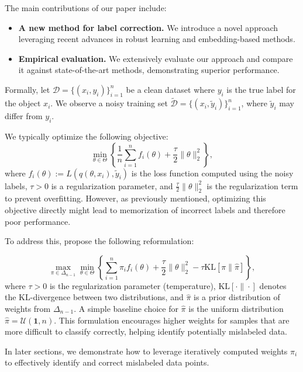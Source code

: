 \documentclass[12pt]{article}
\begin{document}
The main contributions of our paper include:
\begin{itemize}
    \item \textbf{A new method for label correction.} We introduce a novel approach leveraging recent advances in robust learning and embedding-based methods.
    \item \textbf{Empirical evaluation.} We extensively evaluate our approach and compare it against state-of-the-art methods, demonstrating superior performance.
\end{itemize}

Formally, let \(\mathcal{D} = \{(x_i, y_i)\}_{i=1}^{n}\) be a clean dataset where \(y_i\) is the true label for the object \(x_i\). We observe a noisy training set \(\tilde{\mathcal{D}} = \{(x_i, \tilde{y}_i)\}_{i=1}^{n}\), where \(\tilde{y}_i\) may differ from \(y_i\).

We typically optimize the following objective:
\begin{equation}
    \min_{\theta \in \Theta} \left\{
        \frac{1}{n}\sum_{i=1}^{n} f_i(\theta) + \frac{\tau}{2}\|\theta\|_2^2
    \right\},
\end{equation}
where \(f_i(\theta) := L(q(\theta, x_i), \tilde{y}_i)\) is the loss function computed using the noisy labels, \(\tau > 0\) is a regularization parameter, and \(\frac{\tau}{2}\|\theta\|_2^2\) is the regularization term to prevent overfitting. However, as previously mentioned, optimizing this objective directly might lead to memorization of incorrect labels and therefore poor performance.

To address this, \citet{also} propose the following reformulation:

\begin{equation}
    \max_{\pi \in \Delta_{n-1}} \min_{\theta \in \Theta}
    \left\{
        \sum_{i=1}^{n}\pi_i f_i(\theta)
        + \frac{\tau}{2}\|\theta\|_2^2
        - \tau\text{KL}[\pi\|\hat{\pi}]
    \right\},
\end{equation}
where \(\tau > 0\) is the regularization parameter (temperature), \(\text{KL}[\cdot\|\cdot]\) denotes the KL-divergence between two distributions, and \(\hat{\pi}\) is a prior distribution of weights from \(\Delta_{n-1}\). A simple baseline choice for \(\hat{\pi}\) is the uniform distribution \(\hat{\pi} = \mathcal{U}(\mathbf{1}, n)\). This formulation encourages higher weights for samples that are more difficult to classify correctly, helping identify potentially mislabeled data.

In later sections, we demonstrate how to leverage iteratively computed weights \(\pi_i\) to effectively identify and correct mislabeled data points.






\end{document}
